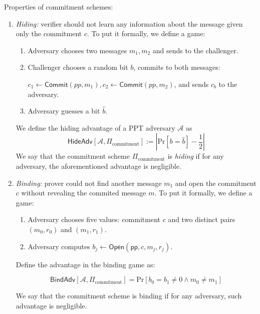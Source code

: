 \documentclass[../lecture-notes.tex]{subfiles}
\begin{document}
\begin{definition}
    Properties of commitment schemes:
    \begin{enumerate}
        \item \textit{Hiding: } verifier should not learn any information about the message given only the commitment $c$. To put it formally, we define a game:
        \begin{enumerate}
            \item Adversary chooses two messages $m_1,m_2$ and sends to the challenger.
            \item Challenger chooses a random bit $b$, commits to both messages: 
            
                $c_1 \gets \mathsf{Commit}(pp, m_1), c_2 \gets \mathsf{Commit}(pp,m_2)$, 
                    and sends $c_b$ to the adversary.
            \item Adversary guesses a bit $\hat{b}$.
        \end{enumerate}
        
        We define the hiding advantage of a PPT adversary $\mathcal{A}$ as 
        \begin{equation}
            \mathsf{HideAdv}[\mathcal{A}, \Pi_{\text{commitment}}] := \left| \text{Pr}[b=\hat{b}] - \frac{1}{2} \right|
        \end{equation}
        We say that the commitment scheme $\Pi_{\text{commitment}}$ is \textit{hiding} if for any adversary, the aforementioned advantage is negligible.
        
        \item \textit{Binding: } prover could not find another message $m_1$ and open the commitment $c$ without revealing the commited message $m$.
        To put it formally, we define a game:
        
        \begin{enumerate}
            \item Adversary chooses five values: commitment $c$ and two distinct pairs $(m_0,r_0)$ and $(m_1,r_1)$.
            \item Adversary computes $b_j \gets \mathsf{Open}(\mathsf{pp}, c, m_j, r_j)$. 
        \end{enumerate}
        
        Define the advantage in the binding game as:
        
        \begin{equation}
            \mathsf{BindAdv}[\mathcal{A}, \Pi_{\text{commitment}}] = \text{Pr}[b_0 = b_1 \neq 0 \wedge m_0 \neq m_1]
        \end{equation}

        We say that the commitment scheme is binding if for any adversary, such advantage is negligible.

    \end{enumerate}
\end{definition}
\end{document}
